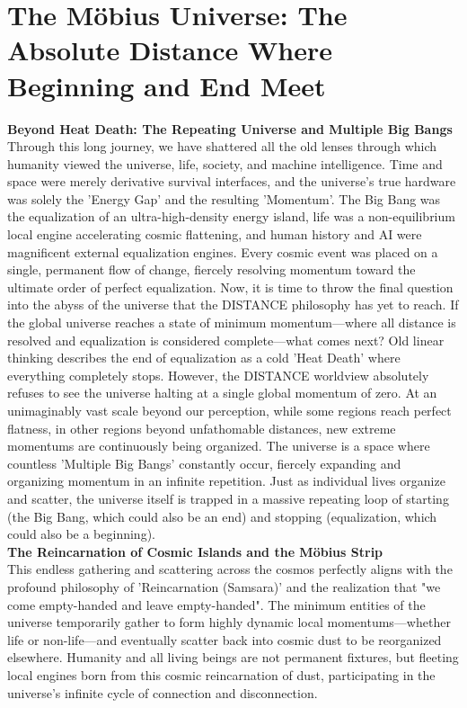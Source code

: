 

\section{The Möbius Universe: The Absolute Distance Where Beginning and End Meet}
\textbf{Beyond Heat Death: The Repeating Universe and Multiple Big Bangs} \\
Through this long journey, we have shattered all the old lenses through which humanity viewed the universe, life, society, and machine intelligence. Time and space were merely derivative survival interfaces, and the universe's true hardware was solely the 'Energy Gap' and the resulting 'Momentum'. The Big Bang was the equalization of an ultra-high-density energy island, life was a non-equilibrium local engine accelerating cosmic flattening, and human history and AI were magnificent external equalization engines. Every cosmic event was placed on a single, permanent flow of change, fiercely resolving momentum toward the ultimate order of perfect equalization.
Now, it is time to throw the final question into the abyss of the universe that the DISTANCE philosophy has yet to reach. If the global universe reaches a state of minimum momentum—where all distance is resolved and equalization is considered complete—what comes next?
Old linear thinking describes the end of equalization as a cold 'Heat Death' where everything completely stops. However, the DISTANCE worldview absolutely refuses to see the universe halting at a single global momentum of zero. At an unimaginably vast scale beyond our perception, while some regions reach perfect flatness, in other regions beyond unfathomable distances, new extreme momentums are continuously being organized. The universe is a space where countless 'Multiple Big Bangs' constantly occur, fiercely expanding and organizing momentum in an infinite repetition. Just as individual lives organize and scatter, the universe itself is trapped in a massive repeating loop of starting (the Big Bang, which could also be an end) and stopping (equalization, which could also be a beginning). \\
\textbf{The Reincarnation of Cosmic Islands and the Möbius Strip} \\
This endless gathering and scattering across the cosmos perfectly aligns with the profound philosophy of 'Reincarnation (Samsara)' and the realization that "we come empty-handed and leave empty-handed". The minimum entities of the universe temporarily gather to form highly dynamic local momentums—whether life or non-life—and eventually scatter back into cosmic dust to be reorganized elsewhere. Humanity and all living beings are not permanent fixtures, but fleeting local engines born from this cosmic reincarnation of dust, participating in the universe's infinite cycle of connection and disconnection.
